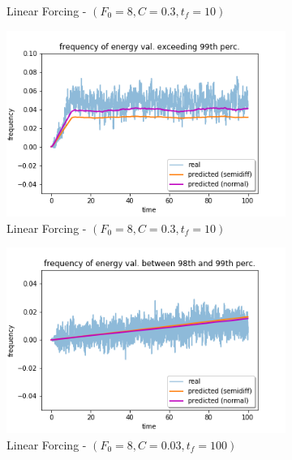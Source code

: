\documentclass{article}
\begin{document}
\begin{figure}[!ht]
\begin{subfigure}[b]{0.48\textwidth}
		\caption{Linear Forcing - $(F_0=8, C=0.3, t_f=10)$}
		\label{fig:pred_energy_bin_098q_099q_L_03_10}
	\end{subfigure}%
	\begin{subfigure}[b]{0.48\textwidth}
		\includegraphics[width=1\linewidth]{fig/pred_energy_exceed_099q_L_03_10.png}
		\caption{Linear Forcing - $(F_0=8, C=0.3, t_f=10)$}
		\label{fig:pred_energy_exceed_099q_L_03_10}
	\end{subfigure}
	\begin{subfigure}[b]{0.48\textwidth}
		\includegraphics[width=1\linewidth]{fig/pred_energy_bin_098q_099q_L_003_100.png}
		\caption{Linear Forcing - $(F_0=8, C=0.03, t_f=100)$}
		\label{fig:pred_energy_bin_098q_099q_L_003_100}
	\end{subfigure}%
	\begin{subfigure}[b]{0.48\textwidth}

\end{subfigure}
\end{figure}
\end{document}
